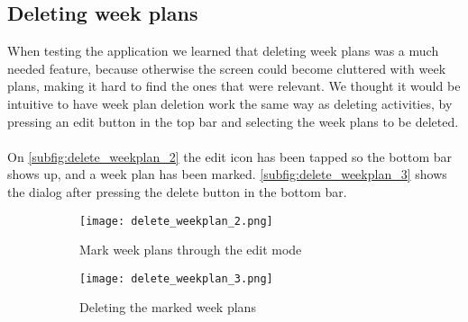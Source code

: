 \subsection{Deleting week plans}
When testing the application we learned that deleting week plans was a much needed feature, because otherwise the screen could become cluttered with week plans, making it hard to find the ones that were relevant.
We thought it would be intuitive to have week plan deletion work the same way as deleting activities, by pressing an edit button in the top bar and selecting the week plans to be deleted.
\\\\
On \autoref{subfig:delete_weekplan_2} the edit icon has been tapped so the bottom bar shows up, and a week plan has been marked. \autoref{subfig:delete_weekplan_3} shows the dialog after pressing the delete button in the bottom bar.
\begin{figure}[H]
    \begin{subfigure}{0.5\textwidth}
    \texttt{[image: delete\_weekplan\_2.png]}
    \caption{Mark week plans through the edit mode}
    \label{subfig:delete_weekplan_2}
    \end{subfigure}
    \begin{subfigure}{0.5\textwidth}
        \texttt{[image: delete\_weekplan\_3.png]}
    \caption{Deleting the marked week plans}
    \label{subfig:delete_weekplan_3}
    \end{subfigure} 
    \caption{}
    \label{fig:delete_weekplan}
\end{figure}

